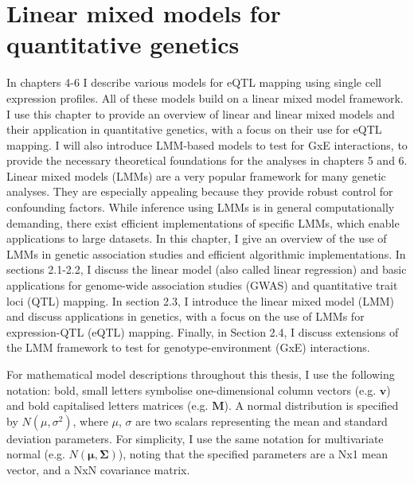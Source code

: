 
\chapter{Linear mixed models for quantitative genetics}

In chapters 4-6 I describe various models for eQTL mapping using single cell expression profiles. 
All of these models build on a linear mixed model framework. 
I use this chapter to provide an overview of linear and linear mixed models and their application in quantitative genetics, with a focus on their use for eQTL mapping. 
I will also introduce LMM-based models to test for GxE interactions, to provide the necessary theoretical foundations for the analyses in chapters 5 and 6.\\

Linear mixed models (LMMs) are a very popular framework for many genetic analyses. 
They are especially appealing because they provide robust control for confounding factors. 
While inference using LMMs is in general computationally demanding, there exist efficient implementations of specific LMMs, which enable applications to large datasets. 
In this chapter, I give an overview of the use of LMMs in genetic association studies and efficient algorithmic implementations. 
In sections 2.1-2.2, I discuss the linear model (also called linear regression) and basic applications for genome-wide association studies (GWAS) and quantitative trait loci (QTL) mapping. 
In section 2.3, I introduce the linear mixed model (LMM) and discuss applications in genetics, with a focus on the use of LMMs for expression-QTL (eQTL) mapping. 
Finally, in Section 2.4, I discuss extensions of the LMM framework to test for genotype-environment (GxE) interactions.\\

\newpage

For mathematical model descriptions throughout this thesis, I use the following notation: bold, small letters symbolise one-dimensional column vectors (e.g. $\mathbf{v}$) and bold capitalised letters matrices (e.g. $\mathbf{M}$). 
A normal distribution is specified by $ N(\mu, \sigma^2)$, where $\mu$, $\sigma$ are two scalars representing the mean and standard deviation parameters.
For simplicity, I use the same notation for multivariate normal (e.g. $ N(\boldsymbol{\mu}, \boldsymbol{\Sigma})$), noting that the specified parameters are a Nx1 mean vector, and a  NxN covariance matrix.

